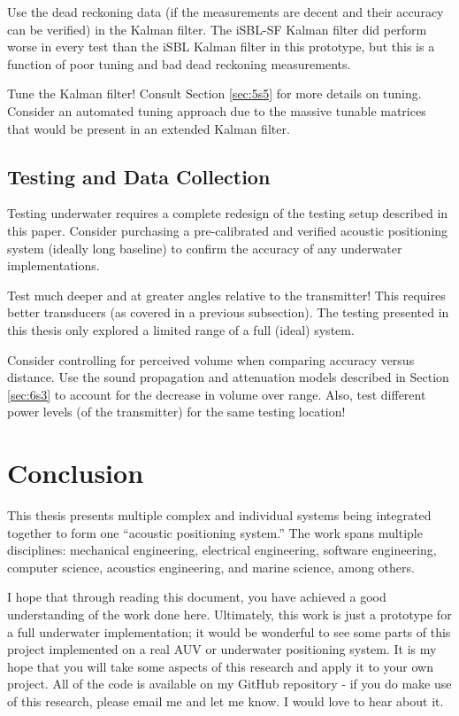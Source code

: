 \documentclass[12pt,a4paper]{report}
\begin{document}
Use the dead reckoning data (if the measurements are decent and their accuracy can be verified) in the Kalman filter. The iSBL-SF Kalman filter did perform worse in every test than the iSBL Kalman filter in this prototype, but this is a function of poor tuning and bad dead reckoning measurements.

Tune the Kalman filter! Consult Section \ref{sec:5s5} for more details on tuning. Consider an automated tuning approach due to the massive tunable matrices that would be present in an extended Kalman filter.

\subsection{Testing and Data Collection} \label{sec:7s1s6}
Testing underwater requires a complete redesign of the testing setup described in this paper. Consider purchasing a pre-calibrated and verified acoustic positioning system (ideally long baseline) to confirm the accuracy of any underwater implementations.

Test much deeper and at greater angles relative to the transmitter! This requires better transducers (as covered in a previous subsection). The testing presented in this thesis only explored a limited range of a full (ideal) system.

Consider controlling for perceived volume when comparing accuracy versus distance. Use the sound propagation and attenuation models described in Section \ref{sec:6s3} to account for the decrease in volume over range. Also, test different power levels (of the transmitter) for the same testing location!

\section{Conclusion} \label{sec:7s2}
This thesis presents multiple complex and individual systems being integrated together to form one “acoustic positioning system.” The work spans multiple disciplines: mechanical engineering, electrical engineering, software engineering, computer science, acoustics engineering, and marine science, among others.

I hope that through reading this document, you have achieved a good understanding of the work done here. Ultimately, this work is just a prototype for a full underwater implementation; it would be wonderful to see some parts of this project implemented on a real AUV or underwater positioning system. It is my hope that you will take some aspects of this research and apply it to your own project. All of the code is available on my GitHub repository - if you do make use of this research, please email me and let me know. I would love to hear about it.




\end{document}
